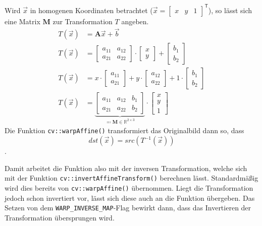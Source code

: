 \documentclass{whswinvcbook}
\begin{document}
Wird $\vec{x}$ in homogenen Koordinaten betrachtet ($\vec{x}=\begin{bmatrix}x&y&1\end{bmatrix}^\mathsf{T}$), so lässt sich eine Matrix $\mathbf{M}$ zur Transformation $T$ angeben.
\begin{align*}
    T(\vec{x})&=\mathbf{A}\vec{x}+\vec{b}\\
    T(\vec{x})&=\begin{bmatrix}a_{11}&a_{12}\\a_{21}&a_{22}\end{bmatrix}\cdot\begin{bmatrix}x\\y\end{bmatrix}+\begin{bmatrix}b_1\\b_2\end{bmatrix}\\
    T(\vec{x})&=x\cdot\begin{bmatrix}a_{11}\\a_{21}\end{bmatrix}+y\cdot\begin{bmatrix}a_{12}\\a_{22}\end{bmatrix}+1\cdot\begin{bmatrix}b_1\\b_2\end{bmatrix}\\
    T(\vec{x})&=\underbrace{\begin{bmatrix}a_{11}&a_{12}&b_1\\a_{21}&a_{22}&b_2\end{bmatrix}}_{\eqqcolon\mathbf{M}\in\mathbb{R}^{2\times3}}\cdot\begin{bmatrix}x\\y\\1\end{bmatrix}
\end{align*}
Die Funktion \texttt{cv::warpAffine()} transformiert das Originalbild dann so, dass $$dst(\vec{x})=src(T^{-1}(\vec{x}))$$.\cite{opencv6}

Damit arbeitet die Funktion also mit der inversen Transformation, welche sich mit der Funktion \texttt{cv::invertAffineTransform()} berechnen lässt. Standardmäßig wird dies bereits von \texttt{cv::warpAffine()} übernommen. Liegt die Transformation jedoch schon invertiert vor, lässt sich diese auch an die Funktion übergeben. Das Setzen von dem \texttt{WARP\_INVERSE\_MAP}-Flag bewirkt dann, dass das Invertieren der Transformation übersprungen wird.
\end{document}
